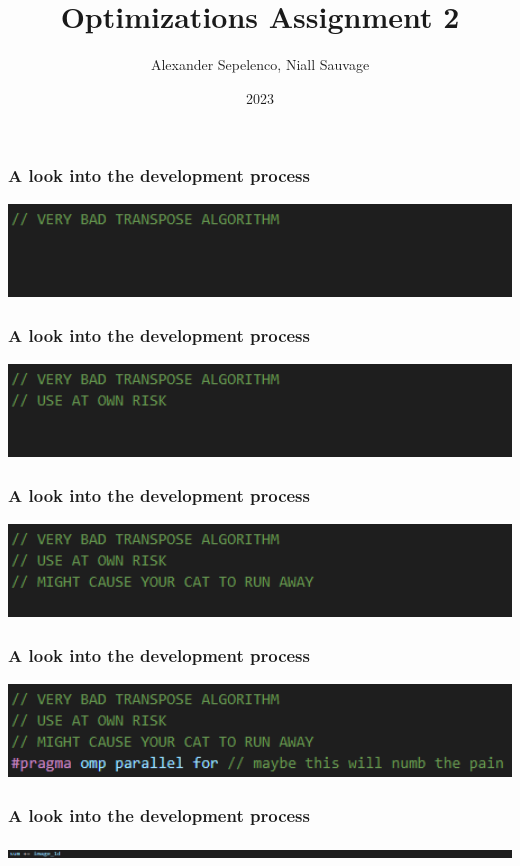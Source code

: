 \documentclass{beamer}
\title{Optimizations Assignment 2}
\author{Alexander Sepelenco, Niall Sauvage}
\date{2023}
\begin{document}
\frame{\titlepage}

\begin{frame}[fragile]
\frametitle{A look into the development process}
\includegraphics[width=1\textwidth]{images/opening_slide_joke1}
\end{frame}

\begin{frame}[fragile]
\frametitle{A look into the development process}
\includegraphics[width=1\textwidth]{images/opening_slide_joke2}
\end{frame}

\begin{frame}[fragile]
\frametitle{A look into the development process}
\includegraphics[width=1\textwidth]{images/opening_slide_joke3}
\end{frame}

\begin{frame}[fragile]
\frametitle{A look into the development process}
\includegraphics[width=1\textwidth]{images/opening_slide_joke4}
\end{frame}

\begin{frame}[fragile]
\frametitle{A look into the development process}
\includegraphics[width=1\textwidth]{images/dereference_j_1}
\end{frame}
  
\end{document}
